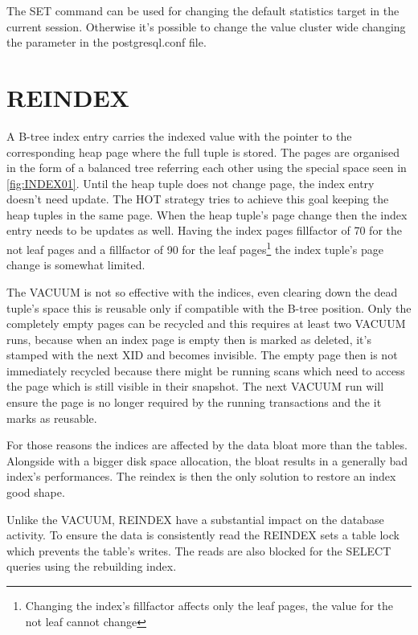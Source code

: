 The SET command can be used for changing the default statistics target in the 
current session. Otherwise it's possible to change the value cluster wide changing the parameter 
in the postgresql.conf file.

\section{REINDEX}\label{sec:REINDEX}
A B-tree index entry carries the indexed value with the pointer to the corresponding heap page
where the full tuple is stored. The pages are organised in the form of a balanced tree 
referring each other using the special space seen in \ref{fig:INDEX01}. Until the heap tuple 
does not change page, the index entry doesn't need update. The HOT strategy 
tries to achieve this goal keeping the heap tuples in the same page. When the heap tuple's page 
change then the index entry needs to be updates as well. Having the index pages fillfactor of 70 for 
the not leaf pages and a fillfactor of 90 for the leaf pages\footnote{Changing the index's 
fillfactor affects only 
the leaf pages, the value for the not leaf cannot change} the index tuple's page 
change is somewhat limited.\newline

The VACUUM is not so effective with the indices, even clearing down the dead tuple's space this is 
reusable only if compatible with the B-tree position. Only the completely empty pages can be 
recycled and this requires at least two VACUUM runs, because when an index page is empty 
then is marked as deleted, it's stamped with the next XID and becomes invisible. The empty page 
then is not immediately recycled because there might be running scans which need to access the page 
which is still visible in their snapshot. The next VACUUM run will ensure the page is no longer 
required by the running transactions and the it marks as reusable.\newline

For those reasons the indices are affected by the data bloat more than the tables. Alongside 
with a bigger disk space allocation, the bloat results in a generally bad index's performances. 
The reindex is then the only solution to restore an index good shape.\newline

Unlike the VACUUM, REINDEX have a substantial impact on the database activity. To ensure 
the data is consistently read the REINDEX sets a table lock which prevents the table's writes. The 
reads are also blocked for the SELECT queries using the rebuilding index.\newline

